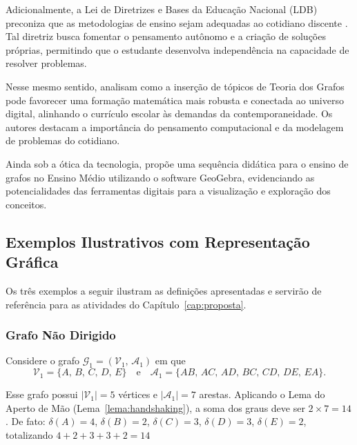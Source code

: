 \documentclass[
  12pt,
  oneside,
  a4paper,
  english,
  brazilian
  ]{abntex2}
\theoremstyle{definition}
\begin{document}
Adicionalmente, a Lei de Diretrizes e Bases da Educação Nacional (LDB) preconiza que as metodologias de ensino sejam adequadas ao cotidiano discente \cite{brasil1996}. Tal diretriz busca fomentar o pensamento autônomo e a criação de soluções próprias, permitindo que o estudante desenvolva independência na capacidade de resolver problemas.

Nesse mesmo sentido,  analisam como a inserção de tópicos de Teoria dos Grafos pode favorecer uma formação matemática mais robusta e conectada ao universo digital, alinhando o currículo escolar às demandas da contemporaneidade. Os autores destacam a importância do pensamento computacional e da modelagem de problemas do cotidiano.

Ainda sob a ótica da tecnologia,  propõe uma sequência didática para o ensino de grafos no Ensino Médio utilizando o software GeoGebra, evidenciando as potencialidades das ferramentas digitais para a visualização e exploração dos conceitos.

\subsection{Exemplos Ilustrativos com Representação Gráfica}

Os três exemplos a seguir ilustram as definições apresentadas e servirão de
referência para as atividades do Capítulo~\ref{cap:proposta}.

\subsubsection{Grafo Não Dirigido}


\label{ex:nao_dirigido}
Considere o grafo $\mathcal{G}_1 = (\mathcal{V}_1,\, \mathcal{A}_1)$ em que
\[
  \mathcal{V}_1 = \{A,\, B,\, C,\, D,\, E\}
  \quad \text{e} \quad
  \mathcal{A}_1 = \{AB,\, AC,\, AD,\, BC,\, CD,\, DE,\, EA\}.
\]

Esse grafo possui $|\mathcal{V}_1| = 5$ vértices e $|\mathcal{A}_1| = 7$
arestas. Aplicando o Lema do Aperto de Mão
(Lema~\ref{lema:handshaking}), a soma dos graus deve ser $2 \times 7 = 14$. De fato: $\delta(A) = 4$, $\delta(B) = 2$, $\delta(C) = 3$, $\delta(D) = 3$,
$\delta(E) = 2$, totalizando $4 + 2 + 3 + 3 + 2 = 14$ \checkmark
\end{document}
